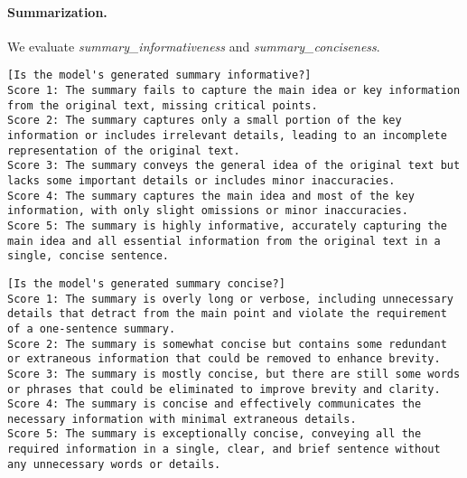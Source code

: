 \paragraph{Summarization.} We evaluate \emph{summary\_informativeness} and \emph{summary\_conciseness}.
\begin{lstlisting}[label=lst:judge_rubrics_summ1,caption={Rubric used for the \emph{summary\_informativeness} criterion.}]
[Is the model's generated summary informative?]
Score 1: The summary fails to capture the main idea or key information from the original text, missing critical points.
Score 2: The summary captures only a small portion of the key information or includes irrelevant details, leading to an incomplete representation of the original text.
Score 3: The summary conveys the general idea of the original text but lacks some important details or includes minor inaccuracies.
Score 4: The summary captures the main idea and most of the key information, with only slight omissions or minor inaccuracies.
Score 5: The summary is highly informative, accurately capturing the main idea and all essential information from the original text in a single, concise sentence.
\end{lstlisting}
\begin{lstlisting}[label=lst:judge_rubrics_summ2,caption={Rubric used for the \emph{summary\_conciseness} criterion.}]
[Is the model's generated summary concise?]
Score 1: The summary is overly long or verbose, including unnecessary details that detract from the main point and violate the requirement of a one-sentence summary.
Score 2: The summary is somewhat concise but contains some redundant or extraneous information that could be removed to enhance brevity.
Score 3: The summary is mostly concise, but there are still some words or phrases that could be eliminated to improve brevity and clarity.
Score 4: The summary is concise and effectively communicates the necessary information with minimal extraneous details.
Score 5: The summary is exceptionally concise, conveying all the required information in a single, clear, and brief sentence without any unnecessary words or details.
\end{lstlisting}

\newpage
